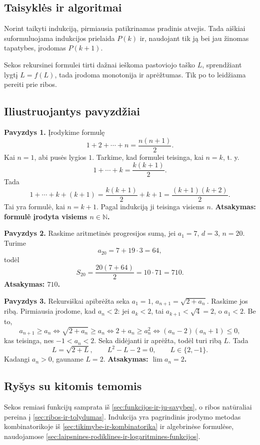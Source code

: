 \subsection{Taisyklės ir algoritmai}

Norint taikyti indukciją, pirmiausia patikrinamas pradinis atvejis. Tada aiškiai suformuluojama indukcijos prielaida $P(k)$ ir, naudojant tik ją bei jau žinomas tapatybes, įrodomas $P(k+1)$.

Sekos rekursinei formulei tirti dažnai ieškoma pastoviojo taško $L$, sprendžiant lygtį $L=f(L)$, tada įrodoma monotonija ir aprėžtumas. Tik po to leidžiama pereiti prie ribos.

\subsection{Iliustruojantys pavyzdžiai}

\textbf{Pavyzdys 1.} Įrodykime formulę
\[
1+2+\cdots+n=\frac{n(n+1)}{2}.
\]
Kai $n=1$, abi pusės lygios $1$. Tarkime, kad formulei teisinga, kai $n=k$, t. y.
\[
1+\cdots+k=\frac{k(k+1)}{2}.
\]
Tada
\[
1+\cdots+k+(k+1)=\frac{k(k+1)}{2}+k+1=\frac{(k+1)(k+2)}{2}.
\]
Tai yra formulė, kai $n=k+1$. Pagal indukciją ji teisinga visiems $n$. \textbf{Atsakymas: formulė įrodyta visiems $n\in\mathbb{N}$.}

\textbf{Pavyzdys 2.} Raskime aritmetinės progresijos sumą, jei $a_1=7$, $d=3$, $n=20$. Turime
\[
a_{20}=7+19\cdot 3=64,
\]
todėl
\[
S_{20}=\frac{20(7+64)}{2}=10\cdot 71=710.
\]
\textbf{Atsakymas: $710$.}

\textbf{Pavyzdys 3.} Rekursiškai apibrėžta seka $a_1=1$, $a_{n+1}=\sqrt{2+a_n}$. Raskime jos ribą. Pirmiausia įrodome, kad $a_n<2$: jei $a_k<2$, tai $a_{k+1}<\sqrt4=2$, o $a_1<2$. Be to,
\[
a_{n+1}\ge a_n \iff \sqrt{2+a_n}\ge a_n \iff 2+a_n\ge a_n^2 \iff (a_n-2)(a_n+1)\le0,
\]
kas teisinga, nes $-1<a_n<2$. Seka didėjanti ir aprėžta, todėl turi ribą $L$. Tada
\[
L=\sqrt{2+L},\qquad L^2-L-2=0,\qquad L\in\{2,-1\}.
\]
Kadangi $a_n>0$, gauname $L=2$. \textbf{Atsakymas: $\lim a_n=2$.}

\subsection{Ryšys su kitomis temomis}

Sekos remiasi funkcijų samprata iš \ref{sec:funkcijos-ir-ju-savybes}, o ribos natūraliai pereina į \ref{sec:ribos-ir-tolydumas}. Indukcija yra pagrindinis įrodymo metodas kombinatorikoje iš \ref{sec:tikimybe-ir-kombinatorika} ir algebrinėse formulėse, naudojamose \ref{sec:laipsnines-rodiklines-ir-logaritmines-funkcijos}.

